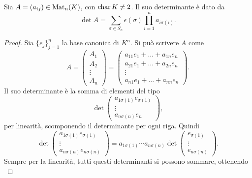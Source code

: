 \begin{teorema}
	Sia $A=(a_{ij})\in\operatorname{Mat}_n(K)$, con $\operatorname{char} K\neq 2$.
	Il suo determinante è dato da
	\begin{equation}\label{eq:determinante-leibnitz}
		\det A=\sum_{\sigma\in S_n}\epsilon(\sigma)\prod_{i=1}^na_{i\sigma(i)}.
	\end{equation}
\end{teorema}
\begin{proof}
	Sia $\{e_j\}_{j=1}^n$ la base canonica di $K^n$.
	Si può scrivere $A$ come
	\begin{equation*}
		A=
		\begin{pmatrix}
			A_1\\A_2\\\vdots\\A_n
		\end{pmatrix}
		=
		\begin{pmatrix}
			a_{11}e_1+\dots+a_{1n}e_n\\
			a_{21}e_1+\dots+a_{2n}e_n\\
			\vdots\\
			a_{n1}e_1+\dots+a_{nn}e_n
		\end{pmatrix}.
	\end{equation*}
	Il suo determinante è la somma di elementi del tipo
	\begin{equation*}
		\det
		\begin{pmatrix}
			a_{1\sigma(1)}e_{\sigma(1)}\\
			\vdots\\
			a_{n\sigma(n)}e_n
		\end{pmatrix},
	\end{equation*}
	per linearità, scomponendo il determinante per ogni riga.
	Quindi
	\begin{equation*}
		\det
		\begin{pmatrix}
			a_{1\sigma(1)}e_{\sigma(1)}\\
			\vdots\\
			a_{n\sigma(n)}e_{n\sigma(n)}
		\end{pmatrix}
		=a_{1\sigma(1)}\cdots a_{n\sigma(n)}\det
		\begin{pmatrix}
			e_{\sigma(1)}\\
			\vdots\\e_{n\sigma(n)}
		\end{pmatrix}.
	\end{equation*}
	Sempre per la linearità, tutti questi determinanti si possono sommare, ottenendo
	\begin{equation*}

\end{equation*}
\end{proof}

